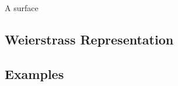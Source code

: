 

  \begin{defn}
    A surface 
  \end{defn}




\subsection{Weierstrass Representation}

\subsection{Examples}